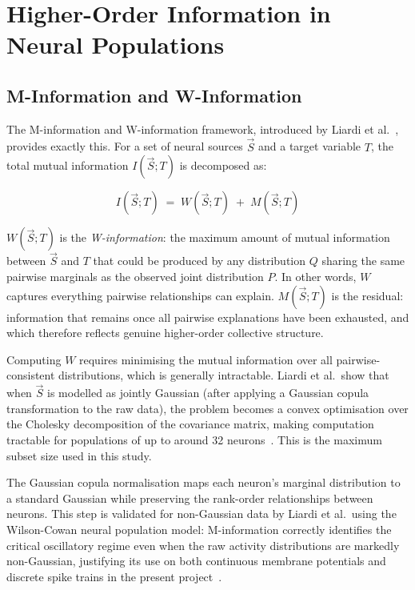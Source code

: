 \documentclass[12pt,twoside]{report}
\begin{document}
\section{Higher-Order Information in Neural Populations}
\label{sec:minfo}

\subsection{M-Information and W-Information}

The M-information and W-information framework, introduced by Liardi et al.~\cite{liardiscalable}, 
provides exactly this. For a set of neural sources $\vec{S}$ and a target variable $T$, 
the total mutual information $I(\vec{S}; T)$ is decomposed as:

\begin{equation}
    I(\vec{S}; T) \;=\; W(\vec{S}; T) \;+\; M(\vec{S}; T)
    \label{eq:mw}
\end{equation}

$W(\vec{S}; T)$ is the \emph{W-information}: the maximum amount of mutual information 
between $\vec{S}$ and $T$ that could be produced by any distribution $Q$ sharing the 
same pairwise marginals as the observed joint distribution $P$. In other words, $W$ 
captures everything pairwise relationships can explain. $M(\vec{S}; T)$ is the residual: 
information that remains once all pairwise explanations have been exhausted, and which 
therefore reflects genuine higher-order collective structure.

Computing $W$ requires minimising the mutual information over all pairwise-consistent 
distributions, which is generally intractable. Liardi et al.\ show that when $\vec{S}$ 
is modelled as jointly Gaussian (after applying a Gaussian copula transformation to
the raw data), the problem becomes a convex optimisation over the Cholesky 
decomposition of the covariance matrix, making computation tractable for populations 
of up to around 32 neurons~\cite{liardiscalable}. This is the maximum subset size 
used in this study.

The Gaussian copula normalisation maps each neuron's marginal distribution to a 
standard Gaussian while preserving the rank-order relationships between neurons. This 
step is validated for non-Gaussian data by Liardi et al.\ using the Wilson-Cowan 
neural population model: M-information correctly identifies the critical oscillatory 
regime even when the raw activity distributions are markedly non-Gaussian, justifying 
its use on both continuous membrane potentials and discrete spike trains in the present 
project~\cite{liardiscalable}. 
\end{document}
